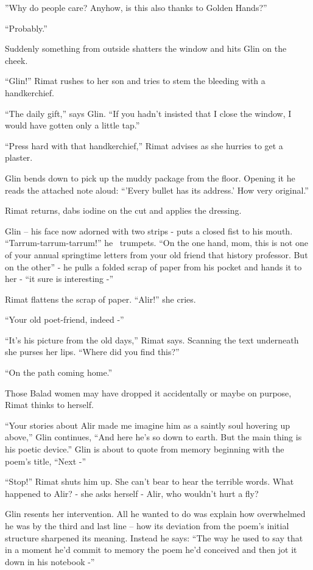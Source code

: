 \documentclass[twoside,11pt]{book}
\begin{document}
''Why do people care? Anyhow, is this also
thanks to Golden
Hands?''

``Probably.''

Suddenly something from outside shatters the window and hits Glin on
the cheek.

``Glin!'' Rimat rushes to her son and tries to stem the bleeding
with a handkerchief.

``The daily gift,'' says Glin. ``If you hadn't insisted that
I close the window, I would have gotten only a little
tap.''

``Press hard with that
handkerchief,'' Rimat advises as she hurries to get
a plaster.

Glin bends down to pick up the muddy
package from the floor. Opening it he reads the attached note aloud:
``'Every bullet has its address.' How very
original.''

Rimat returns, dabs iodine on the cut and applies the
dressing.

Glin -- his face now adorned with two strips
- puts a closed fist
to his mouth. ``Tarrum-tarrum-tarrum!'' he \ trumpets. ``On the
one hand, mom, this is not one of your annual springtime letters from
your old friend that history professor. But on the
other'' - he pulls a folded scrap of paper from his pocket and hands it to her
- ``it sure is interesting -'' 

Rimat flattens the scrap of paper. ``Alir!'' she cries.

``Your old poet-friend, indeed -''

``It's his picture from the old days,'' Rimat says. Scanning the
text underneath she purses her lips. ``Where did you find this?'' 

``On the path coming home.'' 

Those Balad women may have dropped it accidentally or maybe on purpose, Rimat thinks to
herself. 

``Your stories about Alir made me imagine him as a
saintly soul hovering up above,'' Glin continues, ``And here he's so down to earth. But the
main thing is his poetic device.'' Glin is about to quote from memory beginning with the poem's title, ``Next -'' 

``Stop!'' Rimat shuts him
up. She can't bear to hear the terrible words. What happened to Alir?
- she asks herself - Alir, who wouldn't  hurt a fly?

Glin resents her intervention. All he wanted to do
was explain how overwhelmed he was by the third and last line -- how
its deviation from the poem's initial structure sharpened its meaning. Instead he says: ``The way he used to say that
in a moment he'd commit to memory the poem he'd conceived and then
jot it down in his notebook -'' 
\end{document}
